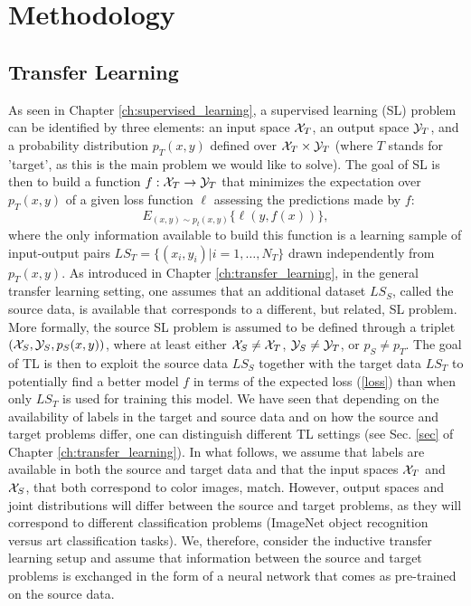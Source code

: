 \section{Methodology}
\label{sec:ch_4_methods}
\subsection{Transfer Learning}
\label{subsec:tl}

As seen in Chapter \ref{ch:supervised_learning}, a supervised learning (SL) problem can be identified by three elements: an input space ${\cal X}_T$, an output space ${\cal Y}_T$, and a probability distribution $p_T(x,y)$ defined over ${\cal X}_T\times {\cal Y}_T$ (where $T$ stands for 'target', as this is the main problem we would like to solve). The goal of SL is then to build a function $f:{\cal X}_T\rightarrow{\cal Y}_T$ that minimizes the expectation over $p_T(x,y)$ of a given loss function $\ell$ assessing the predictions made by $f$:
\begin{equation}\label{loss}
  E_{(x,y)\sim p_t(x,y)} \{\ell(y,f(x))\},
\end{equation}
where the only information available to build this function is a learning sample of input-output pairs $LS_T=\{(x_i,y_i)|i=1,\ldots,N_T\}$ drawn independently from $p_T(x,y)$. As introduced in Chapter \ref{ch:transfer_learning}, in the general transfer learning setting, one assumes that an additional dataset $LS_S$, called the source data, is available that corresponds to a different, but related, SL problem. More formally, the source SL problem is assumed to be defined through a triplet $({\cal X}_S,{\cal Y}_S,p_S(x,y))$, where at least either ${\cal X}_S\neq {\cal X}_T$, ${\cal Y}_S\neq {\cal Y}_T$, or $p_S\neq p_T$. The goal of TL is then to exploit the source data $LS_S$ together with the target data $LS_T$ to potentially find a better model $f$ in terms of the expected loss (\ref{loss}) than when only $LS_T$ is used for training this model.
We have seen that depending on the availability of labels in the target and source data and on how the source and target problems differ, one can distinguish different TL settings (see Sec. \ref{sec} of Chapter \ref{ch:transfer_learning}). In what follows, we assume that labels are available in both the source and target data and that the input spaces ${\cal X}_T$ and ${\cal X}_S$, that both correspond to color images, match. However, output spaces and joint distributions will differ between the source and target problems, as they will correspond to different classification problems (ImageNet object recognition versus art classification tasks). We, therefore, consider the inductive transfer learning setup and assume that information between the source and target problems is exchanged in the form of a neural network that comes as pre-trained on the source data. 

